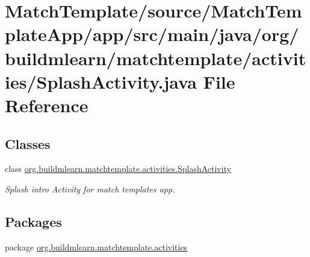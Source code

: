 \hypertarget{MatchTemplate_2source_2MatchTemplateApp_2app_2src_2main_2java_2org_2buildmlearn_2matchtemplate_2c57a5baf8db48cc1ee3fbe7e03511d51}{}\section{Match\+Template/source/\+Match\+Template\+App/app/src/main/java/org/buildmlearn/matchtemplate/activities/\+Splash\+Activity.java File Reference}
\label{MatchTemplate_2source_2MatchTemplateApp_2app_2src_2main_2java_2org_2buildmlearn_2matchtemplate_2c57a5baf8db48cc1ee3fbe7e03511d51}
\subsection*{Classes}
\begin{DoxyCompactItemize}
\item 
class \hyperlink{classorg_1_1buildmlearn_1_1matchtemplate_1_1activities_1_1SplashActivity}{org.\+buildmlearn.\+matchtemplate.\+activities.\+Splash\+Activity}
\begin{DoxyCompactList}\small\item\em Splash intro Activity for match template\textquotesingle{}s app. \end{DoxyCompactList}\end{DoxyCompactItemize}
\subsection*{Packages}
\begin{DoxyCompactItemize}
\item 
package \hyperlink{namespaceorg_1_1buildmlearn_1_1matchtemplate_1_1activities}{org.\+buildmlearn.\+matchtemplate.\+activities}
\end{DoxyCompactItemize}

